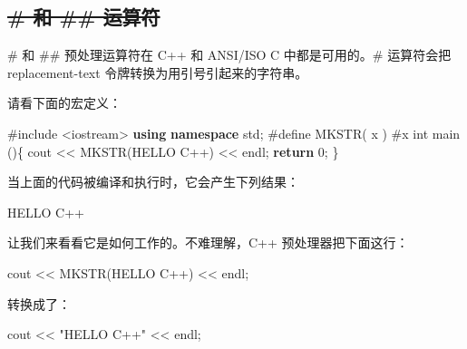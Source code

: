 \documentclass[
]{article}
\newenvironment{Shaded}{}{}
\newcommand{\ControlFlowTok}[1]{\textcolor[rgb]{0.00,0.44,0.13}{\textbf{#1}}}
\newcommand{\DataTypeTok}[1]{\textcolor[rgb]{0.56,0.13,0.00}{#1}}
\newcommand{\DecValTok}[1]{\textcolor[rgb]{0.25,0.63,0.44}{#1}}
\newcommand{\ImportTok}[1]{#1}
\newcommand{\KeywordTok}[1]{\textcolor[rgb]{0.00,0.44,0.13}{\textbf{#1}}}
\newcommand{\NormalTok}[1]{#1}
\newcommand{\OperatorTok}[1]{\textcolor[rgb]{0.40,0.40,0.40}{#1}}
\newcommand{\PreprocessorTok}[1]{\textcolor[rgb]{0.74,0.48,0.00}{#1}}
\newcommand{\StringTok}[1]{\textcolor[rgb]{0.25,0.44,0.63}{#1}}
\begin{document}
\hypertarget{ux548c-ux8fd0ux7b97ux7b26}{%
\subsection{\texorpdfstring{\sout{\# 和 \#\#
运算符}}{\# 和 \#\# 运算符}}\label{ux548c-ux8fd0ux7b97ux7b26}}

\# 和 \#\# 预处理运算符在 C++ 和 ANSI/ISO C 中都是可用的。\# 运算符会把
replacement-text 令牌转换为用引号引起来的字符串。

请看下面的宏定义：

\begin{Shaded}
\begin{Highlighting}[]
\PreprocessorTok{\#include }\ImportTok{\textless{}iostream\textgreater{}}
\KeywordTok{using} \KeywordTok{namespace}\NormalTok{ std}\OperatorTok{;}
\PreprocessorTok{\#define MKSTR}\OperatorTok{(}\PreprocessorTok{ }\NormalTok{x}\PreprocessorTok{ }\OperatorTok{)}\PreprocessorTok{ \#}\NormalTok{x}
\DataTypeTok{int}\NormalTok{ main }\OperatorTok{()\{}    
\NormalTok{   cout }\OperatorTok{\textless{}\textless{}}\NormalTok{ MKSTR}\OperatorTok{(}\NormalTok{HELLO C}\OperatorTok{++)} \OperatorTok{\textless{}\textless{}}\NormalTok{ endl}\OperatorTok{;}
   \ControlFlowTok{return} \DecValTok{0}\OperatorTok{;}
\OperatorTok{\}}
\end{Highlighting}
\end{Shaded}

当上面的代码被编译和执行时，它会产生下列结果：

\begin{Shaded}
\begin{Highlighting}[]
\NormalTok{HELLO C}\OperatorTok{++}
\end{Highlighting}
\end{Shaded}

让我们来看看它是如何工作的。不难理解，C++ 预处理器把下面这行：

\begin{Shaded}
\begin{Highlighting}[]
\NormalTok{cout }\OperatorTok{\textless{}\textless{}}\NormalTok{ MKSTR}\OperatorTok{(}\NormalTok{HELLO C}\OperatorTok{++)} \OperatorTok{\textless{}\textless{}}\NormalTok{ endl}\OperatorTok{;}
\end{Highlighting}
\end{Shaded}

转换成了：

\begin{Shaded}
\begin{Highlighting}[]
\NormalTok{cout }\OperatorTok{\textless{}\textless{}} \StringTok{"HELLO C++"} \OperatorTok{\textless{}\textless{}}\NormalTok{ endl}\OperatorTok{;}
\end{Highlighting}
\end{Shaded}
\end{document}
